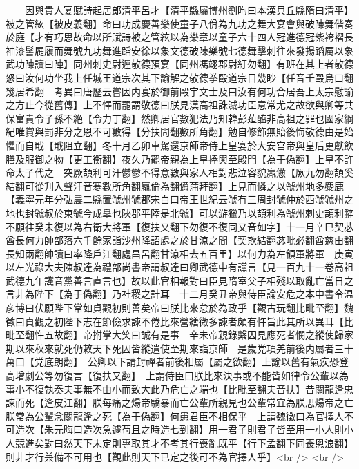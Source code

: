 　　因與貴人宴賦詩起居郎清平呂才【清平縣屬博州劉昫曰本漢貝丘縣隋曰清平】被之管絃【被皮義翻】命曰功成慶善樂使童子八佾為九功之舞大宴會與破陳舞偕奏於庭【才有巧思故命以所賦詩被之管絃以為樂章以童子六十四人冠進德冠紫袴褶長袖漆髻屣履而舞號九功舞進蹈安徐以象文德破陳樂號七德舞擊刺往來發揚蹈厲以象武功陳讀曰陣】同州刺史尉遲敬德預宴【同州馮翊郡尉紆勿翻】有班在其上者敬德怒曰汝何功坐我上任城王道宗次其下諭解之敬德拳毆道宗目幾眇【任音壬毆烏口翻幾居希翻　考異曰唐歷云嘗因内宴於御前毆宇文士及曰汝有何功合居吾上太宗慰諭之方止今從舊傳】上不懌而罷謂敬德曰朕見漢高祖誅滅功臣意常尤之故欲與卿等共保富貴令子孫不絶【令力丁翻】然卿居官數犯法乃知韓彭葅醢非高祖之罪也國家綱紀唯賞與罰非分之恩不可數得【分扶問翻數所角翻】勉自修飾無貽後悔敬德由是始懼而自戢【戢阻立翻】冬十月乙卯車駕還京師帝侍上皇宴於大安宫帝與皇后更獻飲膳及服御之物【更工衡翻】夜久乃罷帝親為上皇捧輿至殿門【為于偽翻】上皇不許命太子代之　突厥頡利可汗鬱鬱不得意數與家人相對悲泣容貌羸憊【厥九勿翻頡奚結翻可從刋入聲汗音寒數所角翻羸倫為翻憊蒲拜翻】上見而憐之以虢州地多麋鹿【義寜元年分弘農二縣置虢州虢郡宋白曰帝王世紀云虢有三周封虢仲於西虢虢州之地也封虢叔於東虢今成臯也陜郡平陸是北虢】可以游獵乃以頡利為虢州刺史頡利辭不願往癸未復以為右衛大將軍【復扶又翻下勿復不復同又音如字】十一月辛巳契苾酋長何力帥部落六千餘家詣沙州降詔處之於甘涼之間【契欺結翻苾毗必翻酋慈由翻長知兩翻帥讀曰率降戶江翻處昌呂翻甘涼相去五百里】以何力為左領軍將軍　庚寅以左光祿大夫陳叔達為禮部尚書帝謂叔達曰卿武德中有讜言【見一百九十一卷高祖武德九年讜音黨善言直言也】故以此官相報對曰臣見隋室父子相殘以取亂亡當日之言非為陛下【為于偽翻】乃社稷之計耳　十二月癸丑帝與侍臣論安危之本中書令温彦博曰伏願陛下常如貞觀初則善矣帝曰朕比來怠於為政乎【觀古玩翻比毗至翻】魏徵曰貞觀之初陛下志在節儉求諫不倦比來營繕微多諫者頗有忤旨此其所以異耳【比毗至翻忤五故翻】帝拊掌大笑曰誠有是事　辛未帝親錄繫囚見應死者憫之縱使歸家期以來秋來就死仍敕天下死囚皆縱遣使至期來詣京師　是歲党項羌前後内屬者三十萬口【党底朗翻】　公卿以下請封禪者前後相屬【屬之欲翻】上諭以舊有氣疾恐登高增劇公等勿復言【復扶又翻】　上謂侍臣曰朕比來決事或不能皆如律令公輩以為事小不復執奏夫事無不由小而致大此乃危亡之端也【比毗至翻夫音扶】昔關龍逢忠諫而死【逢皮江翻】朕每痛之煬帝驕暴而亡公輩所親見也公輩常宜為朕思煬帝之亡朕常為公輩念關龍逢之死【為于偽翻】何患君臣不相保乎　上謂魏徵曰為官擇人不可造次【朱元晦曰造次急遽苟且之時造七到翻】用一君子則君子皆至用一小人則小人競進矣對曰然天下未定則專取其才不考其行喪亂既平【行下孟翻下同喪悤浪翻】則非才行兼備不可用也【觀此則天下已定之後可不為官擇人乎】<br />
<br />
